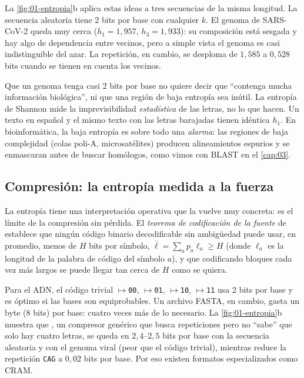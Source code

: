 La \cref{fig:01-entropia}b aplica estas ideas a tres secuencias de la misma longitud. La secuencia aleatoria tiene 2 bits por base con cualquier $k$. El genoma de SARS-CoV-2 queda muy cerca ($h_1=1{,}957$, $h_3=1{,}933$): su composición está sesgada y hay algo de dependencia entre vecinos, pero a simple vista el genoma es casi indistinguible del azar. La repetición, en cambio, se desploma de $1{,}585$ a $0{,}528$ bits cuando se tienen en cuenta los vecinos.

\begin{cuidado}
Que un genoma tenga casi 2 bits por base no quiere decir que ``contenga mucha información biológica'', ni que una región de baja entropía sea inútil. La entropía de Shannon mide la imprevisibilidad \emph{estadística} de las letras, no lo que hacen. Un texto en español y el mismo texto con las letras barajadas tienen idéntica $h_1$. En bioinformática, la baja entropía es sobre todo una \emph{alarma}: las regiones de baja complejidad (colas poli-A, microsatélites) producen alineamientos espurios y se enmascaran antes de buscar homólogos, como vimos con BLAST en el \cref{cap:03}.
\end{cuidado}

\subsection{Compresión: la entropía medida a la fuerza}

La entropía tiene una interpretación operativa que la vuelve muy concreta: es el límite de la compresión sin pérdida. El \emph{teorema de codificación de la fuente} de \textcite{c01-shannon1948} establece que ningún código binario decodificable sin ambigüedad puede usar, en promedio, menos de $H$ bits por símbolo, $\bar\ell=\sum_a p_a\ell_a\ge H$ (donde $\ell_a$ es la longitud de la palabra de código del símbolo $a$), y que codificando bloques cada vez más largos se puede llegar tan cerca de $H$ como se quiera.

Para el ADN, el código trivial $\mapsto$\texttt{00}, $\mapsto$\texttt{01}, $\mapsto$\texttt{10}, $\mapsto$\texttt{11} usa 2 bits por base y es óptimo si las bases son equiprobables. Un archivo FASTA, en cambio, gasta un byte (8 bits) por base: cuatro veces más de lo necesario. La \cref{fig:01-entropia}b muestra que , un compresor genérico que busca repeticiones pero no ``sabe'' que solo hay cuatro letras, se queda en $2{,}4$--$2{,}5$ bits por base con la secuencia aleatoria y con el genoma viral (peor que el código trivial), mientras reduce la repetición \texttt{CAG} a $0{,}02$ bits por base. Por eso existen formatos especializados como CRAM.

